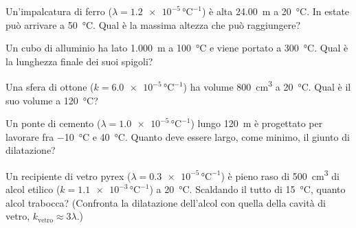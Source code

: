 \begin{esercizio}
Un'impalcatura di ferro ($\lambda = \num{1,2e-5}\,\si{\celsius}^{-1}$) è alta \SI{24,00}{\metre} a \SI{20}{\celsius}. In estate può arrivare a \SI{50}{\celsius}. Qual è la massima altezza che può raggiungere?\\
\end{esercizio}

\begin{esercizio}
Un cubo di alluminio ha lato \SI{1,000}{\metre} a \SI{100}{\celsius} e viene portato a \SI{300}{\celsius}. Qual è la lunghezza finale dei suoi spigoli?\\
\end{esercizio}

\begin{esercizio}
Una sfera di ottone ($k = \num{6,0e-5}\,\si{\celsius}^{-1}$) ha volume \SI{800}{\centi\metre\cubed} a \SI{20}{\celsius}. Qual è il suo volume a \SI{120}{\celsius}?\\
\end{esercizio}

\begin{esercizio}
Un ponte di cemento ($\lambda = \num{1,0e-5}\,\si{\celsius}^{-1}$) lungo \SI{120}{\metre} è progettato per lavorare fra \SI{-10}{\celsius} e \SI{40}{\celsius}. Quanto deve essere largo, come minimo, il giunto di dilatazione?\\
\end{esercizio}

\begin{esercizio}
Un recipiente di vetro pyrex ($\lambda = \num{0,3e-5}\,\si{\celsius}^{-1}$) è pieno raso di \SI{500}{\centi\metre\cubed} di alcol etilico ($k = \num{1,1e-3}\,\si{\celsius}^{-1}$) a \SI{20}{\celsius}. Scaldando il tutto di \SI{15}{\celsius}, quanto alcol trabocca? (Confronta la dilatazione dell'alcol con quella della cavità di vetro, $k_{\text{vetro}} \approx 3\lambda$.)\\
\end{esercizio}

